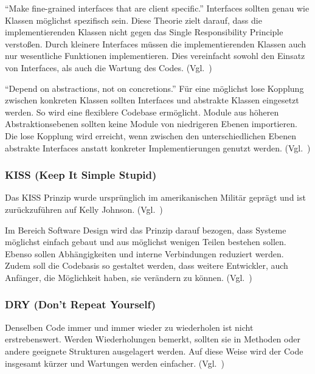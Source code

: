 \enquote{Make fine-grained interfaces that are client specific.}\cite{solid}
Interfaces sollten genau wie Klassen möglichst spezifisch sein.
Diese Theorie zielt darauf, dass die implementierenden Klassen nicht gegen das Single Responsibility Principle verstoßen.
Durch kleinere Interfaces müssen die implementierenden Klassen auch nur wesentliche Funktionen implementieren.
Dies vereinfacht sowohl den Einsatz von Interfaces, als auch die Wartung des Codes.
(Vgl.~\cite{design-patterns-php-laravel})

\enquote{Depend on abstractions, not on concretions.}\cite{solid}
Für eine möglichst lose Kopplung zwischen konkreten Klassen sollten Interfaces und abstrakte Klassen eingesetzt werden.
So wird eine flexiblere Codebase ermöglicht.
Module aus höheren Abstraktionsebenen sollten keine Module von niedrigeren Ebenen importieren.
Die lose Kopplung wird erreicht, wenn zwischen den unterschiedlichen Ebenen abstrakte Interfaces anstatt konkreter Implementierungen genutzt werden.
(Vgl.~\cite{design-patterns-php-laravel})

\newpage

\subsubsection{KISS (Keep It Simple Stupid)}
Das KISS Prinzip wurde ursprünglich im amerikanischen Militär geprägt und ist zurückzuführen auf Kelly Johnson.
(Vgl.~\cite{kelly-johnson-memoir})

Im Bereich Software Design wird das Prinzip darauf bezogen, dass Systeme möglichst einfach gebaut und aus möglichst wenigen Teilen bestehen sollen.
Ebenso sollen Abhängigkeiten und interne Verbindungen reduziert werden.
Zudem soll die Codebasis so gestaltet werden, dass weitere Entwickler, auch Anfänger, die Möglichkeit haben, sie verändern zu können.
(Vgl.~\cite{kiss-principle-explained})

\subsubsection{DRY (Don’t Repeat Yourself)}
Denselben Code immer und immer wieder zu wiederholen ist nicht erstrebenswert.
Werden Wiederholungen bemerkt, sollten sie in Methoden oder andere geeignete Strukturen ausgelagert werden.
Auf diese Weise wird der Code insgesamt kürzer und Wartungen werden einfacher.
(Vgl.~\cite{the-pragmatic-programmer})


